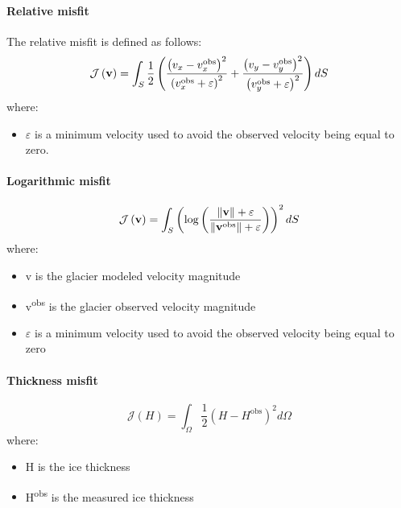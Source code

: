 \paragraph{Relative misfit}%
The relative misfit is defined as follows:
\begin{equation}
	{\mathcal J\left({\bf v}\right)}=
	\int_{S} \dfrac{1}{2}\left(
	 \dfrac{\left(v_x-v_x^{\text{obs}}\right)^{2}}{\left(v_x^{\text{obs}}+\varepsilon\right)^{2}}
	+\dfrac{\left(v_y-v_y^{\text{obs}}\right)^{2}}{\left(v_y^{\text{obs}}+\varepsilon\right)^{2}}
	\right) dS
\end{equation}
where:
\begin{itemize}
	\item $\varepsilon$ is a minimum velocity used to avoid the observed velocity being equal to zero.
\end{itemize}

\paragraph{Logarithmic misfit}%
\begin{equation}
	{\mathcal J\left({\bf v}\right)}
	=\int_{S} \left(\text{log}\left(
	\dfrac{\|{\bf v}\|+\varepsilon}{\|{\bf v}^{\text{obs}}\|+\varepsilon} 
	\right) \right)^2 dS
\end{equation}
where:
\begin{itemize}
	\item v is the glacier modeled velocity magnitude
	\item v\textsuperscript{obs} is the glacier observed velocity magnitude
	\item $\varepsilon$ is a minimum velocity used to avoid the observed velocity being equal to zero
\end{itemize}

\paragraph{Thickness misfit}%
\begin{equation}
	{\mathcal J\left(H\right)}
	=\int_{\Omega} \dfrac{1}{2}
	\left(H-H^{\text{obs}}\right)^{2}
	d\Omega
\end{equation}
where:
\begin{itemize}
	\item H is the ice thickness
	\item H\textsuperscript{obs} is the measured ice thickness
\end{itemize}

